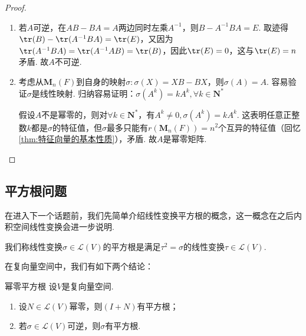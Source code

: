\begin{proof}
    \begin{enumerate}
        \item 若$A$可逆，在$AB-BA=A$两边同时左乘$A^{-1}$，则$B-A^{-1}BA=E$. 取迹得$\tr(B)-\tr(A^{-1}BA)=\tr(E)$，又因为$\tr(A^{-1}BA)=\tr(A^{-1}AB)=\tr(B)$，因此$\tr(E)=0$，这与$\tr(E)=n$矛盾. 故$A$不可逆.
        \item 考虑从$\mathbf{M}_n(F)$到自身的映射$\sigma:\sigma(X)=XB-BX$，则$\sigma(A)=A$. 容易验证$\sigma$是线性映射. 归纳容易证明：$\sigma(A^k)=kA^k,\forall k\in \mathbf{N}^*$

        假设$A$不是幂零的，则对$\forall k \in \mathbf{N}^*$，有$A^k \neq 0,\sigma(A^k)=kA^k$. 这表明任意正整数$k$都是$\sigma$的特征值，但$\sigma$最多只能有$r(\mathbf{M}_n(F))=n^2$个互异的特征值（回忆\autoref{thm:特征向量的基本性质}），矛盾. 故$A$是幂零矩阵.
    \end{enumerate}
\end{proof}

\subsection{平方根问题} %

在进入下一个话题前，我们先简单介绍线性变换平方根的概念，这一概念在之后内积空间线性变换会进一步说明.
\begin{definition}{}{}
    我们称线性变换$\sigma\in \mathcal{L}(V)$的平方根是满足$\tau^2=\sigma$的线性变换$\tau\in \mathcal{L}(V)$.
\end{definition}
在复向量空间中，我们有如下两个结论：
\begin{theorem}{}{幂零平方根}
    设$V$是复向量空间.
    \begin{enumerate}
        \item 设$N\in \mathcal{L}(V)$幂零，则$(I+N)$有平方根；

        \item \label{item:16:幂零平方根:2}
              若$\sigma\in \mathcal{L}(V)$可逆，则$\sigma$有平方根.
    \end{enumerate}
\end{theorem}

